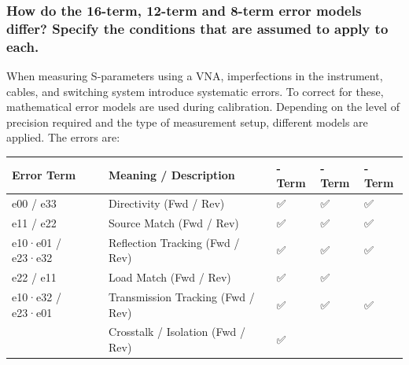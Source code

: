 \documentclass[
  letterpaper,
  DIV=11,
  numbers=noendperiod]{scrartcl}
\begin{document}
\subsubsection{How do the 16-term, 12-term and 8-term error models
differ? Specify the conditions that are assumed to apply to
each.}\label{how-do-the-16-term-12-term-and-8-term-error-models-differ-specify-the-conditions-that-are-assumed-to-apply-to-each.}

When measuring S-parameters using a VNA, imperfections in the
instrument, cables, and switching system introduce systematic errors. To
correct for these, mathematical error models are used during
calibration. Depending on the level of precision required and the type
of measurement setup, different models are applied. The errors are:

\begin{longtable}[]{@{}
  >{\raggedright\arraybackslash}p{}
  >{\raggedright\arraybackslash}p{}
  >{\centering\arraybackslash}p{}
  >{\centering\arraybackslash}p{}
  >{\centering\arraybackslash}p{}@{}}
\toprule\noalign{}
\begin{minipage}[b]{\linewidth}\raggedright
Error Term
\end{minipage} & \begin{minipage}[b]{\linewidth}\raggedright
Meaning / Description
\end{minipage} & \begin{minipage}[b]{\linewidth}\centering
16-Term
\end{minipage} & \begin{minipage}[b]{\linewidth}\centering
12-Term
\end{minipage} & \begin{minipage}[b]{\linewidth}\centering
8-Term
\end{minipage} \\
\midrule\noalign{}
\endhead
\bottomrule\noalign{}
\endlastfoot
e00 / e33 & Directivity (Fwd / Rev) & ✅ & ✅ & ✅ \\
e11 / e22 & Source Match (Fwd / Rev) & ✅ & ✅ & ✅ \\
e10·e01 / e23·e32 & Reflection Tracking (Fwd / Rev) & ✅ & ✅ & ✅ \\
e22 / e11 & Load Match (Fwd / Rev) & ✅ & ✅ & \\
e10·e32 / e23·e01 & Transmission Tracking (Fwd / Rev) & ✅ & ✅ & ✅ \\
& Crosstalk / Isolation (Fwd / Rev) & ✅ & & \\
\end{longtable}
\end{document}
